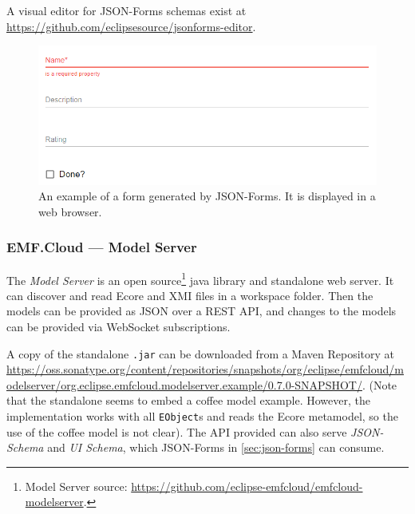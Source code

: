 A visual editor for JSON-Forms schemas exist at \href{https://github.com/eclipsesource/jsonforms-editor}{https://github.com/eclipsesource/jsonforms-editor}.

\begin{figure}[htbp]  %
  \centering
  \includegraphics[width=.8\textwidth]{figures/json-forms-example}
  \caption[JSON-Forms Example]{An example of a form generated by JSON-Forms. It is displayed in a web browser.}\label{fig:json-forms-example}
\end{figure}

\subsubsection{EMF.Cloud --- Model Server}\label{sec:model-server}
The \emph{Model Server} is an \gls{open source}\footnote{Model Server source: \href{https://github.com/eclipse-emfcloud/emfcloud-modelserver}{https://github.com/eclipse-emfcloud/emfcloud-modelserver}.} java library and standalone web server.
It can discover and read \gls{Ecore} and \gls{XMI} files in a workspace folder.
Then the models can be provided as \gls{JSON} over a \gls{REST} \acrshort{API}, and changes to the models can be provided via \gls{WebSocket} subscriptions.~\cite{eugenneufeldEclipseemfcloudEmfcloudmodelserver2020}

A copy of the standalone \texttt{.jar} can be downloaded from a Maven Repository at \href{https://oss.sonatype.org/content/repositories/snapshots/org/eclipse/emfcloud/modelserver/org.eclipse.emfcloud.modelserver.example/0.7.0-SNAPSHOT/}{https://oss.sonatype.org/content/repositories/snapshots/org/eclipse/emfcloud/modelserver/org.eclipse.emfcloud.modelserver.example/0.7.0-SNAPSHOT/}.
(Note that the standalone seems to embed a coffee model example.
However, the implementation works with all \texttt{EObject}s and reads the \gls{Ecore} metamodel, so the use of the coffee model is not clear).
The \acrshort{API} provided can also serve \emph{JSON-Schema} and \emph{UI Schema}, which JSON-Forms in \cref{sec:json-forms} can consume.

